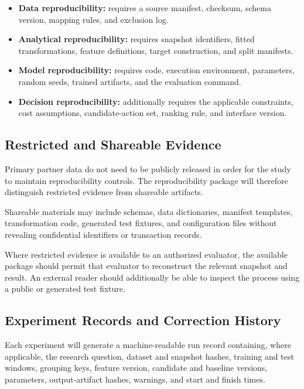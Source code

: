 \documentclass[a4paper,11pt,oneside]{book}
\theoremstyle{plain}
\theoremstyle{definition}
\theoremstyle{remark}
\begin{document}
\begin{itemize}

    \item \textbf{Data reproducibility:}
    requires a source manifest, checksum, schema version, mapping rules, and
    exclusion log.

    \item \textbf{Analytical reproducibility:}
    requires snapshot identifiers, fitted transformations, feature definitions,
    target construction, and split manifests.

    \item \textbf{Model reproducibility:}
    requires code, execution environment, parameters, random seeds, trained
    artifacts, and the evaluation command.

    \item \textbf{Decision reproducibility:}
    additionally requires the applicable constraints, cost assumptions,
    candidate-action set, ranking rule, and interface version.

\end{itemize}


\subsection{Restricted and Shareable Evidence}
\label{subsec:restricted_shareable_evidence}

Primary partner data do not need to be publicly released in order for the study
to maintain reproducibility controls. The reproducibility package will
therefore distinguish restricted evidence from shareable artifacts.

Shareable materials may include schemas, data dictionaries, manifest templates,
transformation code, generated test fixtures, and configuration files without
revealing confidential identifiers or transaction records.

Where restricted evidence is available to an authorized evaluator, the
available package should permit that evaluator to reconstruct the relevant
snapshot and result. An external reader should additionally be able to inspect
the process using a public or generated test fixture.


\subsection{Experiment Records and Correction History}
\label{subsec:experiment_records}

Each experiment will generate a machine-readable run record containing, where
applicable, the research question, dataset and snapshot hashes, training and
test windows, grouping keys, feature version, candidate and baseline versions,
parameters, output-artifact hashes, warnings, and start and finish times.
\end{document}
